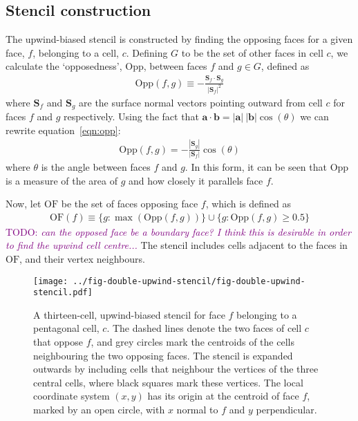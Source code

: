 \documentclass{article}
\newcommand{\TODO}[1]{\textcolor{purple}{TODO: \emph{#1}}}
\begin{document}
\subsection{Stencil construction}
The upwind-biased stencil is constructed by finding the opposing faces for a given face, $f$, belonging to a cell, $c$.  Defining $G$ to be the set of other faces in cell $c$, we calculate the `opposedness', $\mathrm{Opp}$, between faces $f$ and $g \in G$, defined as
\begin{align}
	\mathrm{Opp}(f, g) \equiv - \frac{\mathbf{S}_f \cdot \mathbf{S}_g}{|\mathbf{S}_f|^2} \label{eqn:opp}
\end{align}
where $\mathbf{S}_f$ and $\mathbf{S}_g$ are the surface normal vectors pointing outward from cell $c$ for faces $f$ and $g$ respectively.
Using the fact that $\mathbf{a} \cdot \mathbf{b} = |\mathbf{a}|\:|\mathbf{b}| \cos(\theta)$ we can rewrite equation~\ref{eqn:opp}:
\begin{align}
	\mathrm{Opp}(f, g) = - \frac{|\mathbf{S}_g|}{|\mathbf{S}_f|} \cos(\theta)
\end{align}
where $\theta$ is the angle between faces $f$ and $g$.  In this form, it can be seen that $\mathrm{Opp}$ is a measure of the area of $g$ and how closely it parallels face $f$.

Now, let $\mathrm{OF}$ be the set of faces opposing face $f$, which is defined as
\begin{align}
	\mathrm{OF}(f) \equiv \{ g : \max(\mathrm{Opp}(f, g)) \} \cup \{ g : \mathrm{Opp}(f, g) \geq 0.5 \}
\end{align}
\TODO{can the opposed face be a boundary face?  I think this is desirable in order to find the upwind cell centre...}
The stencil includes cells adjacent to the faces in $\mathrm{OF}$, and their vertex neighbours.

\begin{figure}
	\centering
	\texttt{[image: ../fig-double-upwind-stencil/fig-double-upwind-stencil.pdf]}
	\caption{A thirteen-cell, upwind-biased stencil for face $f$ belonging to a pentagonal cell, $c$.  The dashed lines denote the two faces of cell $c$ that oppose $f$, and grey circles mark the centroids of the cells neighbouring the two opposing faces.  The stencil is expanded outwards by including cells that neighbour the vertices of the three central cells, where black squares mark these vertices.  The local coordinate system $(x, y)$ has its origin at the centroid of face $f$, marked by an open circle, with $x$ normal to $f$ and $y$ perpendicular.}
	\label{fig:double-upwind-stencil}
\end{figure}
\end{document}
